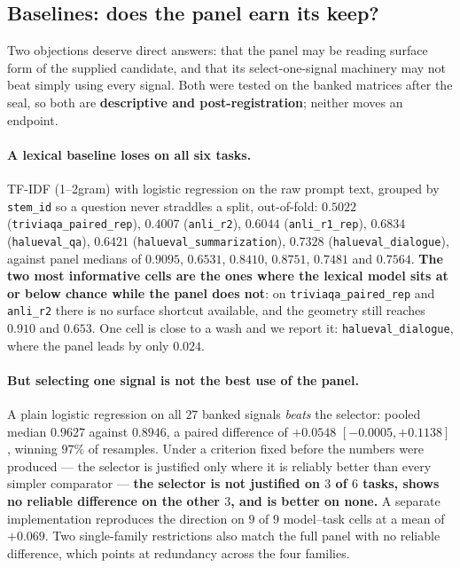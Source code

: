 \documentclass[11pt]{article}
\begin{document}
\subsection{Baselines: does the panel earn its keep?}
\label{sec:baselines}

Two objections deserve direct answers: that the panel may be reading surface
form of the supplied candidate, and that its select-one-signal machinery may
not beat simply using every signal. Both were tested on the banked matrices
after the seal, so both are \textbf{descriptive and post-registration}; neither
moves an endpoint.

\paragraph{A lexical baseline loses on all six tasks.} TF-IDF (1--2gram)
with logistic regression on the raw prompt text, grouped by \texttt{stem\_id}
so a question never straddles a split, out-of-fold: $0.5022$
(\texttt{triviaqa\_paired\_rep}), $0.4007$ (\texttt{anli\_r2}), $0.6044$
(\texttt{anli\_r1\_rep}), $0.6834$ (\texttt{halueval\_qa}), $0.6421$
(\texttt{halueval\_summarization}), $0.7328$ (\texttt{halueval\_dialogue}),
against panel medians of $0.9095$, $0.6531$, $0.8410$, $0.8751$, $0.7481$ and
$0.7564$. \textbf{The two most informative cells are the ones where the
lexical model sits at or below chance while the panel does not}: on
\texttt{triviaqa\_paired\_rep} and \texttt{anli\_r2} there is no surface
shortcut available, and the geometry still reaches $0.910$ and $0.653$. One
cell is close to a wash and we report it: \texttt{halueval\_dialogue}, where
the panel leads by only $0.024$.

\paragraph{But selecting one signal is not the best use of the panel.} A
plain logistic regression on all $27$ banked signals \emph{beats} the
selector: pooled median $0.9627$ against $0.8946$, a paired difference of
$+0.0548$ $[-0.0005, +0.1138]$, winning $97\%$ of resamples. Under a
criterion fixed before the numbers were produced --- the selector is
justified only where it is reliably better than every simpler comparator ---
\textbf{the selector is not justified on $3$ of $6$ tasks, shows no reliable
difference on the other $3$, and is better on none.} A separate
implementation reproduces the direction on $9$ of $9$ model--task cells at a
mean of $+0.069$. Two single-family restrictions also match the full panel
with no reliable difference, which points at redundancy across the four
families.
\end{document}
